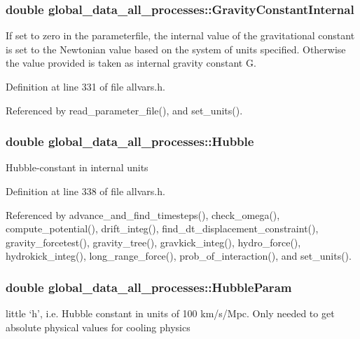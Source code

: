 \hypertarget{structglobal__data__all__processes_a3ebe48dc90c65aa0ed7ddfe8431987b1}{
\subsubsection[{GravityConstantInternal}]{\setlength{\rightskip}{0pt plus 5cm}double {\bf global\_\-data\_\-all\_\-processes::GravityConstantInternal}}}
\label{structglobal__data__all__processes_a3ebe48dc90c65aa0ed7ddfe8431987b1}
If set to zero in the parameterfile, the internal value of the gravitational constant is set to the Newtonian value based on the system of units specified. Otherwise the value provided is taken as internal gravity constant G. 

Definition at line 331 of file allvars.h.



Referenced by read\_\-parameter\_\-file(), and set\_\-units().

\hypertarget{structglobal__data__all__processes_a6e6a37250907d90a56f92a55aefdda5f}{
\subsubsection[{Hubble}]{\setlength{\rightskip}{0pt plus 5cm}double {\bf global\_\-data\_\-all\_\-processes::Hubble}}}
\label{structglobal__data__all__processes_a6e6a37250907d90a56f92a55aefdda5f}
Hubble-\/constant in internal units 

Definition at line 338 of file allvars.h.



Referenced by advance\_\-and\_\-find\_\-timesteps(), check\_\-omega(), compute\_\-potential(), drift\_\-integ(), find\_\-dt\_\-displacement\_\-constraint(), gravity\_\-forcetest(), gravity\_\-tree(), gravkick\_\-integ(), hydro\_\-force(), hydrokick\_\-integ(), long\_\-range\_\-force(), prob\_\-of\_\-interaction(), and set\_\-units().

\hypertarget{structglobal__data__all__processes_a51f2bde6feb49841d60397964a9740ac}{
\subsubsection[{HubbleParam}]{\setlength{\rightskip}{0pt plus 5cm}double {\bf global\_\-data\_\-all\_\-processes::HubbleParam}}}
\label{structglobal__data__all__processes_a51f2bde6feb49841d60397964a9740ac}
little `h', i.e. Hubble constant in units of 100 km/s/Mpc. Only needed to get absolute physical values for cooling physics 

